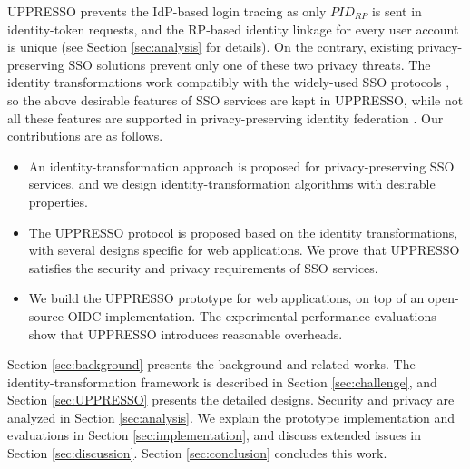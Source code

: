 UPPRESSO prevents the IdP-based login tracing as only $PID_{RP}$ is sent in identity-token requests,
    and the RP-based identity linkage for every user account is unique
    (see Section \ref{sec:analysis} for details).
On the contrary,
     existing privacy-preserving SSO solutions \cite{BrowserID,SPRESSO,NIST2017draft,FirefoxAccount} prevent only one of these two privacy threats.
The identity transformations work compatibly with
    the widely-used SSO protocols \cite{OpenIDConnect,rfc6749,SAML,NIST2017draft},
    so the above desirable features of SSO services are kept in UPPRESSO,
    while not all these features are supported in privacy-preserving identity federation \cite{PseudoID,ELPASSO,UnlimitID,Opaak,uprov,hyperledge-idemix}.
%
%
Our contributions are as follows.
\vspace{-\topsep}\begin{itemize}
\setlength{\topsep}{0pt}
\setlength{\partopsep}{0pt}
\setlength{\itemsep}{0pt}
\setlength{\parsep}{0pt}
\setlength{\parskip}{0pt}
\item An identity-transformation approach is proposed for privacy-preserving SSO services,
        and we design identity-transformation algorithms with desirable properties.
\item
The UPPRESSO protocol is proposed based on the identity transformations,
    with several designs specific for web applications.
We prove that UPPRESSO satisfies the security and privacy requirements of SSO services.

\item
We build the UPPRESSO prototype for web applications,
    on top of an open-source OIDC implementation.
The experimental performance evaluations show that UPPRESSO introduces reasonable overheads.
\end{itemize}


Section \ref{sec:background} presents
    the background and related works.
The identity-transformation framework is described in Section \ref{sec:challenge},
    and Section \ref{sec:UPPRESSO} presents the detailed designs.
Security and privacy are analyzed in Section \ref{sec:analysis}.
We explain the prototype implementation and evaluations in Section \ref{sec:implementation},
 and discuss extended issues in Section \ref{sec:discussion}.
Section \ref{sec:conclusion} concludes this work.
